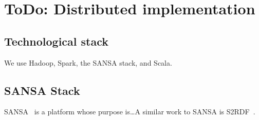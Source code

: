 \documentclass{article}
\begin{document}
\section{ToDo: Distributed implementation}

\subsection{Technological stack}

We use Hadoop, Spark, the SANSA stack, and Scala.

\subsection{SANSA Stack}

SANSA~\cite{lehmann-2017-sansa-iswc} is a platform whose purpose is\ldots A
similar work to SANSA is S2RDF~\cite{schatzle2016s2rdf}.



\end{document}
